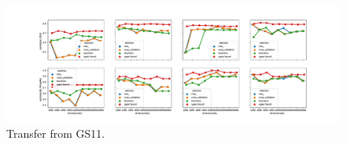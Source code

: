 \begin{figure}
  \centering
    \includegraphics[width=\textwidth]{supplement/figures/GS11-transfer}
    \caption{Transfer from GS11.}
    \label{fig:gs11-transfer}
\end{figure}

